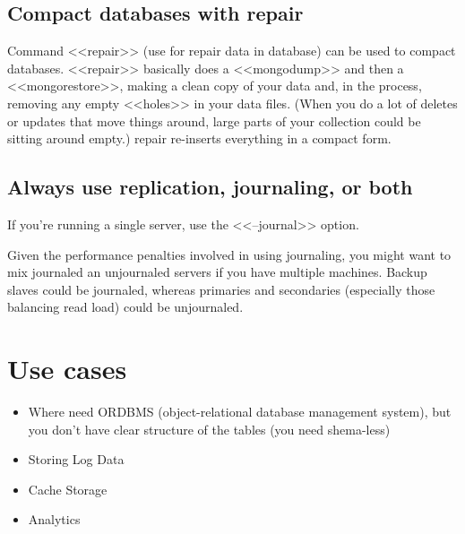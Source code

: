 \subsection{Compact databases with repair}

Command <<repair>> (use for repair data in database) can be used to compact databases. <<repair>> basically does a <<mongodump>> and then a <<mongorestore>>, making a clean copy of your data and, in the process, removing any empty <<holes>> in your data files. (When you do a lot of deletes or updates that move things around, large parts of your collection could be sitting around empty.) repair re-inserts everything in a compact form.\cite{mongodb_tips}

\subsection{Always use replication, journaling, or both}

If you’re running a single server, use the <<--journal>> option.

Given the performance penalties involved in using journaling, you might want to mix journaled an unjournaled servers if you have multiple machines. Backup slaves could be journaled, whereas primaries and secondaries (especially those balancing read load) could be unjournaled.\cite{mongodb_tips}

\section{Use cases}

\begin{itemize}
  \item Where need ORDBMS (object-relational database management system), but you don't have clear structure of the tables (you need shema-less)
  \item Storing Log Data
  \item Cache Storage
  \item Analytics
\end{itemize}